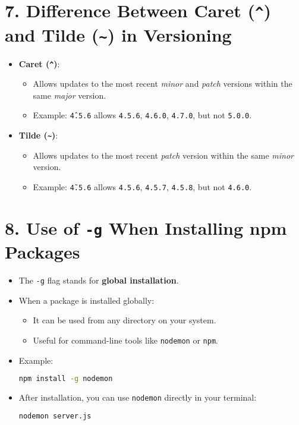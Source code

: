 \documentclass[a4paper,12pt]{article}
\begin{document}
\section*{7. Difference Between Caret (\texttt{\^}) and Tilde (\texttt{\~}) in Versioning}
\begin{itemize}
    \item \textbf{Caret (\texttt{\^})}:
    \begin{itemize}
        \item Allows updates to the most recent \textit{minor} and \textit{patch} versions within the same \textit{major} version.
        \item Example: \texttt{\^4.5.6} allows \texttt{4.5.6}, \texttt{4.6.0}, \texttt{4.7.0}, but not \texttt{5.0.0}.
    \end{itemize}
    \item \textbf{Tilde (\texttt{\~})}:
    \begin{itemize}
        \item Allows updates to the most recent \textit{patch} version within the same \textit{minor} version.
        \item Example: \texttt{\~4.5.6} allows \texttt{4.5.6}, \texttt{4.5.7}, \texttt{4.5.8}, but not \texttt{4.6.0}.
    \end{itemize}
\end{itemize}

\section*{8. Use of \texttt{-g} When Installing npm Packages}
\begin{itemize}
    \item The \texttt{-g} flag stands for \textbf{global installation}.
    \item When a package is installed globally:
    \begin{itemize}
        \item It can be used from any directory on your system.
        \item Useful for command-line tools like \texttt{nodemon} or \texttt{npm}.
    \end{itemize}
    \item Example:
    \begin{lstlisting}[language=bash]
    npm install -g nodemon
    \end{lstlisting}
    \item After installation, you can use \texttt{nodemon} directly in your terminal:
    \begin{lstlisting}[language=bash]
    nodemon server.js
    \end{lstlisting}
\end{itemize}
\end{document}
